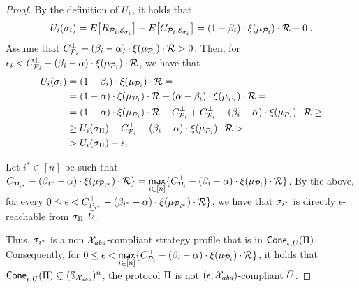 \begin{proof}
    By the definition of $U_i$, it holds that
    \[U_i(\sigma_i) = E\big[R_{\mathcal{P}_i, \mathcal{E}_{\sigma_i}}\big] - E\big[C_{\mathcal{P}_i, \mathcal{E}_{\sigma_i}}\big] = (1 - \beta_i) \cdot \xi(\mu_{\mathcal{P}_i}) \cdot \mathcal{R} - 0\;.\]
    Assume that
    $C^\bot_{\mathcal{P}_i} - (\beta_i - \alpha) \cdot \xi(\mu_{\mathcal{P}_i}) \cdot \mathcal{R} > 0$. Then, for $\epsilon_i < C^\bot_{\mathcal{P}_i} - (\beta_i - \alpha) \cdot \xi(\mu_{\mathcal{P}_i}) \cdot \mathcal{R}$,
    we have that
    \begin{equation*}
        \begin{split}
            U_i(\sigma_i) & = (1 - \beta_i) \cdot \xi(\mu_{\mathcal{P}_i}) \cdot \mathcal{R} = \\
            & = (1 - \alpha) \cdot \xi(\mu_{\mathcal{P}_i}) \cdot \mathcal{R} + (\alpha - \beta_i) \cdot \xi(\mu_{\mathcal{P}_i}) \cdot \mathcal{R} = \\
            & = (1 - \alpha) \cdot \xi(\mu_{\mathcal{P}_i}) \cdot \mathcal{R} - C^\bot_{\mathcal{P}_i} + C^\bot_{\mathcal{P}_i} - (\beta_i - \alpha) \cdot \xi(\mu_{\mathcal{P}_i}) \cdot \mathcal{R} \geq \\
            & \geq U_i(\sigma_{\Pi}) + C^\bot_{\mathcal{P}_i} - (\beta_i - \alpha) \cdot \xi(\mu_{\mathcal{P}_i}) \cdot \mathcal{R} > \\
            & > U_i(\sigma_{\Pi}) + \epsilon_i
        \end{split}
    \end{equation*}

    Let $i^*\in[n]$ be such that
    $C^\bot_{\mathcal{P}_{i^*}} - (\beta_{i^*} - \alpha) \cdot \xi(\mu_{\mathcal{P}_{i^*}}) \cdot \mathcal{R} \} = \underset{i \in [n]}{\mathsf{max}}\{ C^\bot_{\mathcal{P}_i} - (\beta_i - \alpha) \cdot \xi(\mu_{\mathcal{P}_i}) \cdot \mathcal{R} \}$.
    By the above, for every
    $0\leq\epsilon < C^\bot_{\mathcal{P}_{i^*}} - (\beta_{i^*} - \alpha) \cdot \xi(\mu_{\mathcal{P}_{i^*}}) \cdot \mathcal{R} \}$,
    we have that $\sigma_{i^*}$ is directly $\epsilon$-reachable from
    $\sigma_\Pi$ \wrt $\bar{U}$.

    Thus, $\sigma_{i^*}$ is a non $\mathcal{X}_{abs}$-compliant
    strategy profile that is in $\mathsf{Cone}_{\epsilon,
    \bar{U}}(\Pi)$. Consequently, for
    $0 \leq\epsilon < \underset{i \in [n]}{\mathsf{max}}\{ C^\bot_{\mathcal{P}_i} - (\beta_i - \alpha) \cdot \xi(\mu_{\mathcal{P}_i}) \cdot \mathcal{R} \}$,
    it holds that
    $\mathsf{Cone}_{\epsilon, \bar{U}}(\Pi) \subsetneq (\mathbb{S}_{\mathcal{X}_{abs}})^n$,
    \ie the protocol $\Pi$ is not $(\epsilon,
    \mathcal{X}_{abs})$-compliant \wrt $\bar{U}$.
\end{proof}

